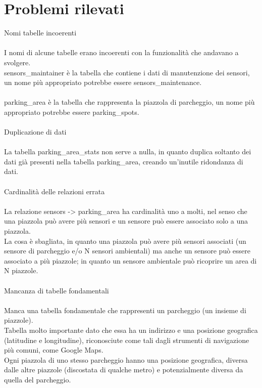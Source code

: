 \section{Problemi rilevati}
Nomi tabelle incoerenti
\\\\
I nomi di alcune tabelle erano incoerenti con la funzionalità che andavano a svolgere.
\\
sensors\_maintainer è la tabella che contiene i dati di manutenzione dei sensori, un 
nome più appropriato potrebbe essere sensors\_maintenance.
\\\\
parking\_area è la tabella che rappresenta la piazzola di parcheggio, un nome più appropriato
potrebbe essere parking\_spots.
\\\\
Duplicazione di dati
\\\\
La tabella parking\_area\_stats non serve a nulla, in quanto duplica soltanto dei dati già presenti
nella tabella parking\_area, creando un'inutile ridondanza di dati.
\\\\
Cardinalità delle relazioni errata
\\\\
La relazione sensors -> parking\_area ha cardinalità uno a molti, nel senso che una piazzola può avere
più sensori e un sensore può essere associato solo a una piazzola. 
\\
La cosa è sbagliata, in quanto una piazzola può avere più sensori associati (un sensore di parcheggio e/o N
sensori ambientali) ma anche un sensore può essere associato a più piazzole; in quanto un sensore ambientale
può ricoprire un area di N piazzole.
\\\\
Mancanza di tabelle fondamentali
\\\\
Manca una tabella fondamentale che rappresenti un parcheggio (un insieme di piazzole). 
\\
Tabella molto importante dato che essa ha un indirizzo e una posizione geografica (latitudine e longitudine), 
riconosciute come tali dagli strumenti di navigazione più comuni, come Google Maps. 
\\
Ogni piazzola di uno stesso parcheggio hanno una posizione geografica, diversa dalle altre piazzole (discostata di qualche 
metro) e potenzialmente diversa da quella del parcheggio. 
\\
